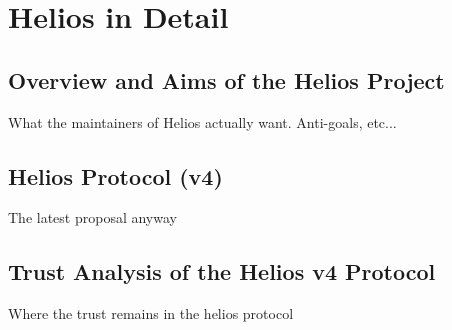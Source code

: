 
\chapter{Helios in Detail}
\label{ch:helios}

\section{Overview and Aims of the Helios Project}
\label{ch:helios:aims}

What the maintainers of Helios actually want. Anti-goals, etc...


\section{Helios Protocol (v4)}
\label{ch:helios:v4}

The latest proposal anyway

\section{Trust Analysis of the Helios v4 Protocol}
\label{ch:helios:trust}

Where the trust remains in the helios protocol
